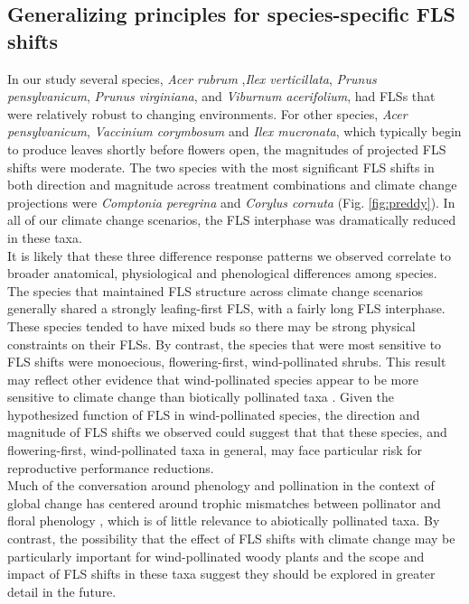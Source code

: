 \documentclass[11pt]{article}
\begin{document}
\subsection{Generalizing principles for species-specific FLS shifts}
\noindent In our study several species, \textit{Acer rubrum} ,\textit{Ilex verticillata}, \textit{Prunus pensylvanicum}, \textit{Prunus virginiana}, and \textit{Viburnum acerifolium}, had FLSs that were relatively robust to changing environments. For other species, \textit{Acer pensylvanicum}, \textit{Vaccinium corymbosum} and \textit{Ilex mucronata}, which typically begin to produce leaves shortly before flowers open, the magnitudes of projected FLS shifts were moderate. The two species with the most significant FLS shifts in both direction and magnitude across treatment combinations and climate change projections were \textit{Comptonia peregrina} and \textit{Corylus cornuta} (Fig. \ref{fig:preddy}). In all of our climate change scenarios, the FLS interphase was dramatically reduced in these taxa.\\
 
\noindent It is likely that these three difference response patterns we observed correlate to broader anatomical, physiological and phenological differences among species. The species that maintained FLS structure across climate change scenarios generally shared a strongly leafing-first FLS, with a fairly long FLS interphase. These species tended to have mixed buds so there may be strong physical constraints on their FLSs. By contrast, the species that were most sensitive to FLS shifts were monoecious, flowering-first, wind-pollinated shrubs. This result may reflect other evidence that wind-pollinated species appear to be more sensitive to climate change than biotically pollinated taxa \citep{Ziello:2012aa}. Given the hypothesized function of FLS in wind-pollinated species, the direction and magnitude of FLS shifts we observed could suggest that that these species, and flowering-first, wind-pollinated taxa in general, may face particular risk for reproductive performance reductions.\\

\noindent Much of the conversation around phenology and pollination in the context of global change has centered around trophic mismatches between pollinator and floral phenology \citep{Memmott2007}, which is of little relevance to abiotically pollinated taxa. By contrast, the possibility that the effect of FLS shifts with climate change may be particularly important for wind-pollinated woody plants and the scope and impact of FLS shifts in these taxa suggest they should be explored in greater detail in the future.
\end{document}
